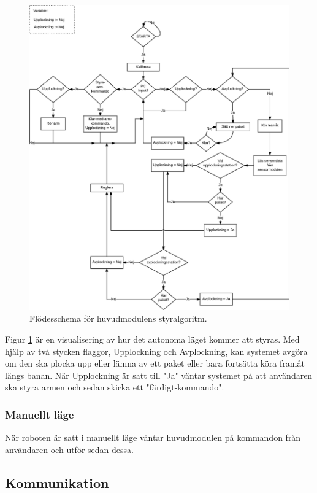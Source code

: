 \begin{figure}[h]
\center
\includegraphics[scale=0.2]{Styrlogik.png}
\caption{Flödesschema för huvudmodulens styralgoritm.} \label{systemskiss:autonomtschema}
\end{figure}

Figur \ref{systemskiss:autonomtschema} är en visualisering av hur det autonoma läget kommer att styras. Med hjälp av två stycken flaggor, Upplockning och Avplockning, kan systemet avgöra om den ska plocka upp eller lämna av ett paket eller bara fortsätta köra framåt längs banan. När Upplockning är satt till "Ja" väntar systemet på att användaren ska styra armen och sedan skicka ett "färdigt-kommando".

\subsubsection{Manuellt läge}
När roboten är satt i manuellt läge väntar huvudmodulen på kommandon från användaren och utför sedan dessa. 

\subsection{Kommunikation}
